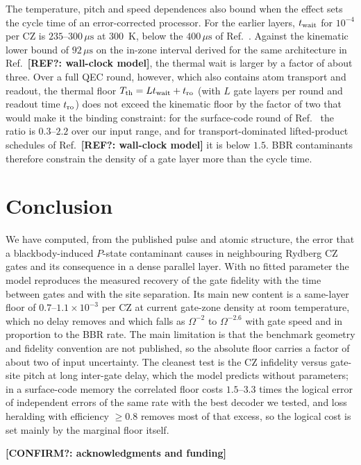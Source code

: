 \documentclass[aps,pra,twocolumn,superscriptaddress,longbibliography,floatfix]{revtex4-2}
\newcommand{\us}{\,\mu\mathrm{s}}
\newcommand{\todo}[1]{\textbf{[#1]}}
\begin{document}
The temperature, pitch and speed dependences also bound when the effect sets the cycle time of an error-corrected processor. For the earlier layers, $t_{\rm wait}$ for $10^{-4}$ per CZ is $235$--$300\us$ at $300$~K, below the $400\us$ of Ref.~\cite{Bluvstein2026}. Against the kinematic lower bound of $92\us$ on the in-zone interval derived for the same architecture in Ref.~\todo{REF?: wall-clock model}, the thermal wait is larger by a factor of about three. Over a full QEC round, however, which also contains atom transport and readout, the thermal floor $T_{\rm th}=Lt_{\rm wait}+t_{\rm ro}$ (with $L$ gate layers per round and readout time $t_{\rm ro}$) does not exceed the kinematic floor by the factor of two that would make it the binding constraint: for the surface-code round of Ref.~\cite{Bluvstein2026} the ratio is $0.3$--$2.2$ over our input range, and for transport-dominated lifted-product schedules of Ref.~\todo{REF?: wall-clock model} it is below $1.5$. BBR contaminants therefore constrain the density of a gate layer more than the cycle time.

\section{Conclusion}
\label{sec:conclusion}

We have computed, from the published pulse and atomic structure, the error that a blackbody-induced $P$-state contaminant causes in neighbouring Rydberg CZ gates and its consequence in a dense parallel layer. With no fitted parameter the model reproduces the measured recovery of the gate fidelity with the time between gates and with the site separation. Its main new content is a same-layer floor of $0.7$--$1.1\times10^{-3}$ per CZ at current gate-zone density at room temperature, which no delay removes and which falls as $\Omega^{-2}$ to $\Omega^{-2.6}$ with gate speed and in proportion to the BBR rate. The main limitation is that the benchmark geometry and fidelity convention are not published, so the absolute floor carries a factor of about two of input uncertainty. The cleanest test is the CZ infidelity versus gate-site pitch at long inter-gate delay, which the model predicts without parameters; in a surface-code memory the correlated floor costs $1.5$--$3.3$ times the logical error of independent errors of the same rate with the best decoder we tested, and loss heralding with efficiency $\ge0.8$ removes most of that excess, so the logical cost is set mainly by the marginal floor itself.

\begin{acknowledgments}
\todo{CONFIRM?: acknowledgments and funding}
\end{acknowledgments}


\end{document}
